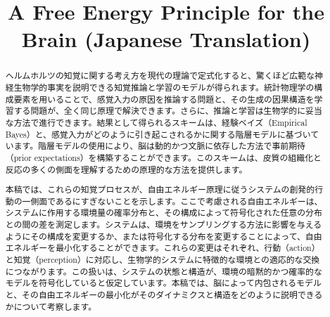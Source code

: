 \documentclass{article}
\title{A Free Energy Principle for the Brain (Japanese Translation)}
\author{} %
\date{} %
\begin{document}
\maketitle

\begin{abstract}
ヘルムホルツの知覚に関する考え方を現代の理論で定式化すると、驚くほど広範な神経生物学的事実を説明できる知覚推論と学習のモデルが得られます。統計物理学の構成要素を用いることで、感覚入力の原因を推論する問題と、その生成の因果構造を学習する問題が、全く同じ原理で解決できます。さらに、推論と学習は生物学的に妥当な方法で進行できます。結果として得られるスキームは、経験ベイズ（Empirical Bayes）と、感覚入力がどのように引き起こされるかに関する階層モデルに基づいています。階層モデルの使用により、脳は動的かつ文脈に依存した方法で事前期待（prior expectations）を構築することができます。このスキームは、皮質の組織化と反応の多くの側面を理解するための原理的な方法を提供します。

本稿では、これらの知覚プロセスが、自由エネルギー原理に従うシステムの創発的行動の一側面であるにすぎないことを示します。ここで考慮される自由エネルギーは、システムに作用する環境量の確率分布と、その構成によって符号化された任意の分布との間の差を測定します。システムは、環境をサンプリングする方法に影響を与えるようにその構成を変更するか、または符号化する分布を変更することによって、自由エネルギーを最小化することができます。これらの変更はそれぞれ、行動（action）と知覚（perception）に対応し、生物学的システムに特徴的な環境との適応的な交換につながります。この扱いは、システムの状態と構造が、環境の暗黙的かつ確率的なモデルを符号化していると仮定しています。本稿では、脳によって内包されるモデルと、その自由エネルギーの最小化がそのダイナミクスと構造をどのように説明できるかについて考察します。
\end{abstract}
\end{document}
